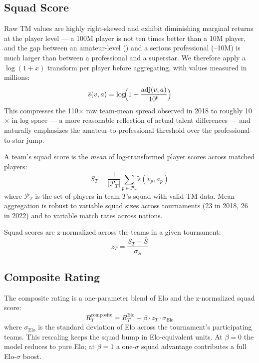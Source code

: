 \documentclass[11pt]{article}
\begin{document}
\subsection{Squad Score}

Raw TM values are highly right-skewed and exhibit diminishing marginal returns at the player level --- a \texteuro 100M player is not ten times better than a \texteuro 10M player, and the gap between an amateur-level () and a serious professional (--10M) is much larger than between a professional and a superstar. We therefore apply a $\log(1+x)$ transform per player before aggregating, with values measured in millions:
\begin{equation}
\tilde{s}(v, a) = \log\!\Bigl(1 + \frac{\text{adj}(v, a)}{10^6}\Bigr)
\label{eq:log_transform}
\end{equation}
This compresses the 110$\times$ raw team-mean spread observed in 2018 to roughly 10$\times$ in log space --- a more reasonable reflection of actual talent differences --- and naturally emphasizes the amateur-to-professional threshold over the professional-to-star jump.

A team's squad score is the \emph{mean} of log-transformed player scores across matched players:
\begin{equation}
S_T = \frac{1}{|\mathcal{P}_T|} \sum_{p \in \mathcal{P}_T} \tilde{s}(v_p, a_p)
\label{eq:squad_score}
\end{equation}
where $\mathcal{P}_T$ is the set of players in team $T$'s squad with valid TM data. Mean aggregation is robust to variable squad sizes across tournaments (23 in 2018, 26 in 2022) and to variable match rates across nations.

Squad scores are z-normalized across the teams in a given tournament:
\begin{equation}
z_T = \frac{S_T - \bar{S}}{\sigma_S}
\label{eq:squad_z}
\end{equation}

\subsection{Composite Rating}
\label{sec:squadcalibration}

The composite rating is a one-parameter blend of Elo and the z-normalized squad score:
\begin{equation}
R_T^{\text{composite}} = R_T^{\text{Elo}} + \beta \cdot z_T \cdot \sigma_{\text{Elo}}
\label{eq:composite}
\end{equation}
where $\sigma_{\text{Elo}}$ is the standard deviation of Elo across the tournament's participating teams. This rescaling keeps the squad bump in Elo-equivalent units. At $\beta = 0$ the model reduces to pure Elo; at $\beta = 1$ a one-$\sigma$ squad advantage contributes a full Elo-$\sigma$ boost.
\end{document}
